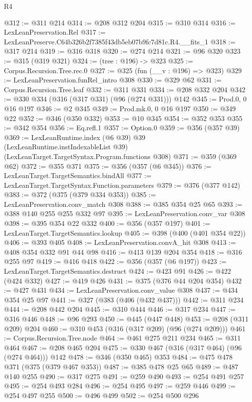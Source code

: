 \begin{lexlean}{R4}
\begin{coremodule}
@312 := @311 @214
@314 := @208 @312 @204
@315 := @310 @314
@316 := LexLeanPreservation.Rel
@317 := LexLeanPreserve.C64b326b2f7385f43db5eb07b9fc7d81c.R4.__fits_1
@318 := @317 @214
@319 := @316 @318
@320 := @274 @214
@321 := @96 @320
@323 := @315 (@319 @321)
@324 := (tree : @196) -> @323
@325 := Corpus.Recursion.Tree.rec.{0}
@327 := @325 (fun (__v : @196) => @323)
@329 := LexLeanPreservation.funRel_intro @308
@330 := @329 @62
@331 := Corpus.Recursion.Tree.leaf
@332 := @311 @331
@334 := @208 @332 @204
@342 := @330 @334 (@316 (@317 @331) (@96 (@274 @331))) @142
@345 := Prod.{0, 0} @16 @197
@346 := @2 @345
@349 := Prod.mk.{0, 0} @16 @197
@350 := @349 @22
@352 := @346 (@350 @332)
@353 := @10 @345
@354 := @352 @353
@355 := @342 @354
@356 := Eq.refl.{1}
@357 := Option.{0}
@359 := @356 (@357 @39)
@369 := LexLeanRuntime.index
    (@6 @39)
    @39
    (LexLeanRuntime.instIndexableList @39)
    (LexLeanTarget.TargetSyntax.Program.functions @308)
@371 := @359 (@369 @62)
@372 := @355 @371
@375 := @356 (@357 (@6 @345))
@376 := LexLeanTarget.TargetSemantics.bindAll
@377 := LexLeanTarget.TargetSyntax.Function.parameters
@379 := @376 (@377 @142)
@383 := @372 (@375 (@379 @334 @353))
@385 := LexLeanPreservation.conv_match @308
@388 := @385 @354 @25 @65
@393 := @388 @140 @255 @255 @332 @97
@395 := LexLeanPreservation.conv_var @308
@398 := @395 @354 @22 @332
@400 := @356 (@357 @197)
@401 := LexLeanTarget.TargetSemantics.lookup
@405 := @398 (@400 (@401 @354 @22))
@406 := @393 @405
@408 := LexLeanPreservation.convA_hit @308
@413 := @408 @354 @332 @91 @44 @98
@416 := @413 @139 @204 @354
@418 := @316 @255 @97
@419 := @416 @418
@422 := @356 (@357 (@6 @197))
@423 := LexLeanTarget.TargetSemantics.destruct
@424 := @423 @91
@426 := @422 (@424 @332)
@427 := @419 @426
@431 := @375 (@376 @44 @204 @354)
@432 := @427 @431
@434 := LexLeanPreservation.conv_value @308
@437 := @434 @354 @25 @97
@441 := @327 (@383 (@406 (@432 @437)))
@442 := @311 @234
@444 := @208 @442 @204
@445 := @310 @444
@446 := @317 @234
@447 := @316 @446
@448 := @96 @293
@450 := @445 (@447 @448)
@453 := @208 (@311 @209) @204
@460 := @310 @453 (@316 (@317 @209) (@96 (@274 @209)))
@461 := Corpus.Recursion.Tree.node
@464 := @461 @275 @211 @234
@465 := @311 @464
@467 := @208 @465 @204
@475 := @330 @467 (@316 (@317 @464) (@96 (@274 @464))) @142
@478 := @346 (@350 @465) @353
@484 := @475 @478 @371 (@375 (@379 @467 @353))
@487 := @385 @478 @25 @65
@489 := @487 @140 @255
@490 := @317 @275
@491 := @259 @490
@493 := @254 @491 @257
@495 := @254 @493 @284
@496 := @254 @495
@497 := @259 @446
@499 := @254 @497 @255
@500 := @496 @499
@502 := @254 @500 @296

\end{coremodule}
\end{lexlean}
